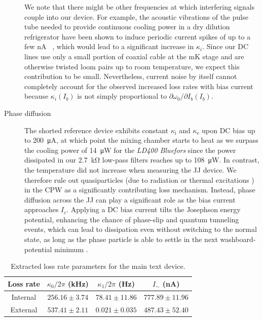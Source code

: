 \begin{description}
	We note that there might be other frequencies at which interfering signals couple into our device.
	For example, the acoustic vibrations of the pulse tube needed to provide continuous cooling power in a dry dilution refrigerator have been shown to induce periodic current spikes of up to a few \si{\nano\ampere} ~\cite{kalraVibrationinducedElectricalNoise2016b}, which would lead to a significant increase in $\kappa_i$.
	Since our DC lines use only a small portion of coaxial cable at the mK stage and are otherwise twisted loom pairs up to room temperature, we expect this contribution to be small.
	Nevertheless, current noise by itself cannot completely account for the observed increased loss rates with bias current because $\kappa_i(I_b)$ is not simply proportional to $\partial\omega_0/\partial I_b(I_b)$.
	\item[Phase diffusion] The shorted reference device exhibits constant $\kappa_\text{i}$ and $\kappa_\text{e}$ upon DC bias up to \SI{200}{\micro\ampere}, at which point the mixing chamber starts to heat as we surpass the cooling power  of \SI{14}{\micro\watt} for the \textit{LD400 Bluefors} since the power dissipated in our \SI{2.7}{\kilo\ohm} low-pass filters reaches up to \SI{108}{\micro\watt}.
	In contrast, the temperature did not increase when measuring the JJ device.
	We therefore rule out quasiparticles (due to radiation or thermal excitations \cite{tinkhamIntroductionSuperconductivity1996}) in the CPW as a significantly contributing loss mechanism.
	Instead, phase diffusion across the JJ can play a significant role as the bias current approaches $I_c$.
	Applying a DC bias current tilts the Josephson energy potential, enhancing the chance of phase-slip and quantum tunneling events, which can lead to dissipation even without switching to the normal state, as long as the phase particle is able to settle in the next washboard-potential minimum \cite{kiviojaWeakCouplingJosephson2005}.
\end{description}

\begin{table}
	\caption{Extracted loss rate parameters for the main text device.\label{tab:lossrates}}
	\begin{tabular}{cccc}
		\hline \hline
		Loss rate         & $\kappa_0/2\pi$ (\si{\kilo\hertz}) & $\kappa_1/2\pi$ (\si{\hertz}) & $I_{\sim}$ (\si{\nano\ampere}) \\
		\hline
		Internal & $256.16 \pm 3.74$             & $78.41 \pm 11.86$      & $777.89 \pm 11.96$             \\
		External & $537.41 \pm 2.11$             & $0.021 \pm 0.035$      & $487.43 \pm 52.40	$             \\
		\hline \hline
	\end{tabular}
\end{table}


